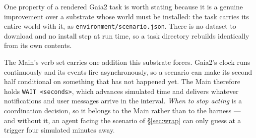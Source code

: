 \documentclass[11pt,a4paper]{article}
\begin{document}
One property of a rendered Gaia2 task is worth stating because it is a genuine improvement over a substrate whose world must be installed: the task carries its entire world with it, as \texttt{environment/scenario.json}. There is no dataset to download and no install step at run time, so a task directory rebuilds identically from its own contents.

The Main's verb set carries one addition this substrate forces. Gaia2's clock runs continuously and its events fire asynchronously, so a scenario can make its second half conditional on something that has not happened yet. The Main therefore holds \texttt{WAIT <seconds>}, which advances simulated time and delivers whatever notifications and user messages arrive in the interval. \emph{When to stop acting} is a coordination decision, so it belongs to the Main rather than to the harness --- and without it, an agent facing the scenario of \S\ref{sec:wrap} can only guess at a trigger four simulated minutes away.
\end{document}
